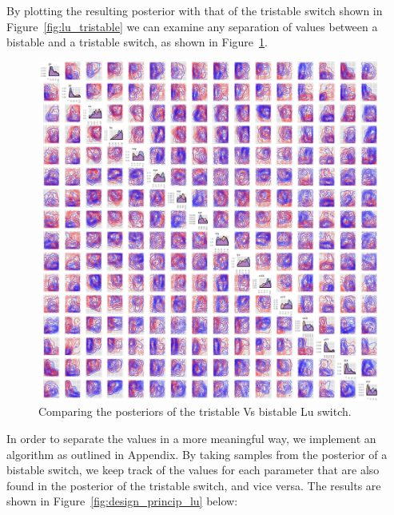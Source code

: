By plotting the resulting posterior with that of the tristable switch shown in Figure~\ref{fig:lu_tristable} we can examine any separation of values between a bistable and a tristable switch, as shown in Figure~\ref{fig:pos_comp_lu}.

\begin{figure}[h]
\centering
\includegraphics[scale=0.4]{chapterStabilityFinder/Lu_switches/images/double_pos/posterior_comparison_bi_tri.png}
\caption{Comparing the posteriors of the tristable Vs bistable Lu switch.}
\label{fig:pos_comp_lu}
\end{figure}
\clearpage

In order to separate the values in a more meaningful way, we implement an algorithm as outlined in Appendix. By taking samples from the posterior of a bistable switch, we keep track of the values for each parameter that are also found in the posterior of the tristable switch, and vice versa. The results are shown in Figure~\ref{fig:design_princip_lu} below:



